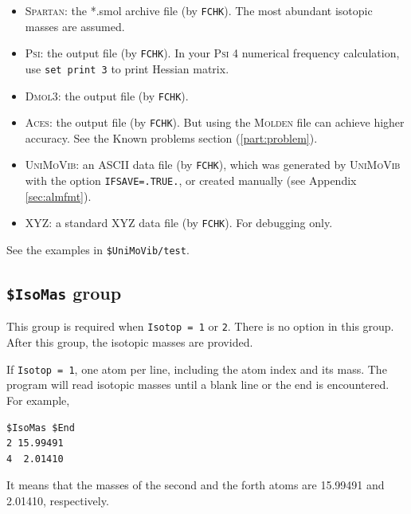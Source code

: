 \documentclass[12pt,english]{extarticle}
\begin{document}
\begin{itemize}
\item \textsc{Spartan}: the *.smol archive file (by \verb|FCHK|). The most abundant isotopic masses are assumed.
\item \textsc{Psi}: the output file (by \verb|FCHK|). In your \textsc{Psi} 4 numerical frequency calculation, use \texttt{set print 3} to print Hessian matrix.
\item \textsc{Dmol3}: the output file (by \verb|FCHK|).
\item \textsc{Aces}: the output file (by \verb|FCHK|). But using the \textsc{Molden} file can achieve higher accuracy. See the Known problems section (\ref{part:problem}).
\item \textsc{UniMoVib}: an ASCII data file (by \verb|FCHK|), which was generated by \textsc{UniMoVib} with the option \verb|IFSAVE=.TRUE.|, or created manually (see Appendix \ref{sec:almfmt}).
\item XYZ: a standard XYZ data file (by \verb|FCHK|). For debugging only.
\end{itemize}

See the examples in \verb|$UniMoVib/test|.


\subsection{\texttt{\$IsoMas} group} \label{sec:inp-isomas}

This group is required when \verb|Isotop = 1| or \verb|2|. There is no option in
this group. After this group, the isotopic masses are provided.

\bigskip{}
If \verb|Isotop = 1|, one atom per line, including the atom index and its
mass. The program will read isotopic masses until a blank line or
the end is encountered. For example,
\begin{Verbatim}[frame=single]
 $IsoMas $End
2 15.99491
4  2.01410
\end{Verbatim}
It means that the masses of the second and the forth atoms are 15.99491 and
2.01410, respectively.
\end{document}
